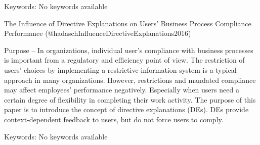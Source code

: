 \documentclass[
  letterpaper,
  DIV=11,
  numbers=noendperiod]{scrartcl}
\begin{document}
Keywords: No keywords available

The Influence of Directive Explanations on Users' Business Process
Compliance Performance (@hadaschInfluenceDirectiveExplanations2016)

Purpose -- In organizations, individual user's compliance with business
processes is important from a regulatory and efficiency point of view.
The restriction of users' choices by implementing a restrictive
information system is a typical approach in many organizations. However,
restrictions and mandated compliance may affect employees' performance
negatively. Especially when users need a certain degree of flexibility
in completing their work activity. The purpose of this paper is to
introduce the concept of directive explanations (DEs). DEs provide
context-dependent feedback to users, but do not force users to comply.

Keywords: No keywords available
\end{document}
